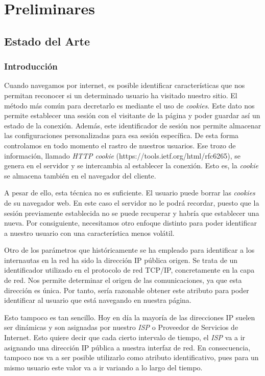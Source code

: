 \chapter{Preliminares}
\section{Estado del Arte}
\subsection{Introducción}
Cuando navegamos por internet, es posible identificar características que nos permitan reconocer si un determinado usuario ha visitado nuestro sitio. El método más común para decretarlo es mediante el uso de \textit{cookies}. Este dato nos permite establecer una sesión con el visitante de la página y poder guardar así un estado de la conexión. Además, este identificador de sesión nos permite almacenar las configuraciones personalizadas para esa sesión específica. De esta forma controlamos en todo momento el rastro de nuestros usuarios. Ese trozo de información, llamado \textit{HTTP cookie} (https://tools.ietf.org/html/rfc6265), se genera en el servidor y se intercambia al establecer la conexión. Esto es, la \textit{cookie} se almacena también en el navegador del cliente. \par

A pesar de ello, esta técnica no es suficiente. El usuario puede borrar las \textit{cookies} de su navegador web. En este caso el servidor no le podrá recordar, puesto que la sesión previamente establecida no se puede recuperar y habría que establecer una nueva. Por consiguiente, necesitamos otro enfoque distinto para poder identificar a nuestro usuario con una característica menos volátil. \par

Otro de los parámetros que históricamente se ha empleado para identificar a los internautas en la red ha sido la dirección IP pública origen. Se trata de un identificador utilizado en el protocolo de red TCP/IP, concretamente en la capa de red. Nos permite determinar el origen de las comunicaciones, ya que esta dirección es única. Por tanto, sería razonable obtener este atributo para poder identificar al usuario que está navegando en nuestra página. \par

Esto tampoco es tan sencillo. Hoy en día la mayoría de las direcciones IP suelen ser dinámicas y son asignadas por nuestro \textit{ISP} o Proveedor de Servicios de Internet. Esto quiere decir que cada cierto intervalo de tiempo, el \textit{ISP} va a ir asignando una dirección IP pública a nuestra interfaz de red. En consecuencia, tampoco nos va a ser posible utilizarlo como atributo identificativo, pues para un mismo usuario este valor va a ir variando a lo largo del tiempo. \par

